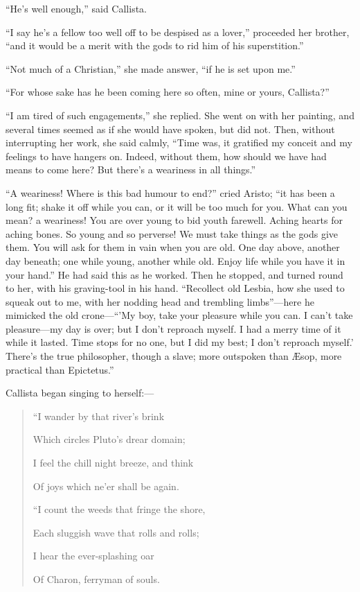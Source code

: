 ``He's well enough,'' said Callista.

``I say he's a fellow too well off to be despised as a
lover,'' proceeded her brother, ``and it would be a merit with
the gods to rid him of his superstition.''

``Not much of a Christian,'' she made answer, ``if he
is set upon me.''

``For whose sake has he been coming here so often, mine or
yours, Callista?''

``I am tired of such engagements,'' she replied. She went
on with her painting, and several times seemed as if she would have
spoken, but did not. Then, without interrupting her work, she said
calmly, ``Time was, it gratified my conceit and my feelings to
have hangers on. Indeed, without them, how should we have had
means to come here? But there's a weariness in all things.''

``A weariness! Where is this bad humour to end?'' cried
Aristo; ``it has been a long fit; shake it off while you can, or
it will be too much for you. What can you mean? a weariness! You are
over young to bid youth farewell. Aching hearts for aching bones. So
young and so perverse! We must take things as the gods give them. You
will ask for them in vain when you are old. One day above, another day
beneath; one while young, another while old. Enjoy life while you have
it in your hand.'' He had said this as he worked. Then he stopped,
and turned round to her, with his graving-tool in his hand.
``Recollect old Lesbia, how she used to squeak out to me, with her
nodding head and trembling limbs''—here he mimicked the old
crone—``'My boy, take your pleasure while you can. I can't take
pleasure—my day is over; but I don't reproach myself. I had a merry
time of it while it lasted. Time stops for no one, but I did my best;
I don't reproach myself.' There's the true philosopher, though a
slave; more outspoken than Æsop, more practical than Epictetus.''

Callista began singing to herself:—

\begin{quote}

``I wander by that river's brink

Which circles Pluto's drear domain;

I feel the chill night breeze, and think

Of joys which ne'er shall be again.

``I count the weeds that fringe the shore,

Each sluggish wave that rolls and rolls;

I hear the ever-splashing oar

Of Charon, ferryman of souls.
\end{quote}

